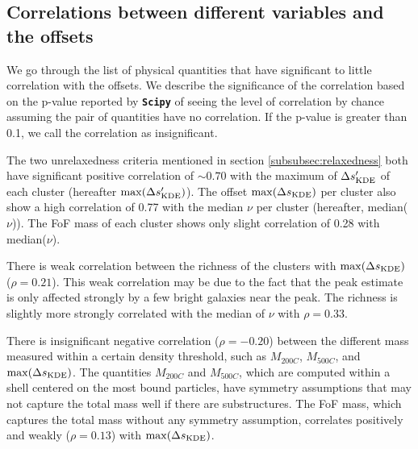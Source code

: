 \subsection{Correlations between different variables and the offsets}

We go through the list of physical quantities that have significant to little
correlation with the offsets. We describe the significance of the correlation 
based on the p-value reported by {\bf \texttt{Scipy}} of seeing the level of 
correlation by chance assuming the pair of 
quantities have no correlation. If the p-value is greater than 0.1, we call the
correlation as insignificant.

The two unrelaxedness criteria mentioned in section \ref{subsubsec:relaxedness}
both have significant positive correlation of $\sim 0.70$
with the maximum of $\Delta s_{\rm KDE}'$ of each cluster
(hereafter $\max(\Delta s_{\rm KDE}')$).
The offset $\max(\Delta s_{\rm KDE})$ per cluster also show a high
correlation of 0.77 with the median $\nu$ per cluster (hereafter,
median($\nu$)). The FoF mass of each cluster shows only slight correlation of 0.28 with 
 median($\nu$).

There is weak correlation between the richness of the
clusters with $\max(\Delta s_{\rm KDE})$ ($\rho = 0.21$). This weak correlation 
may be due to 
the fact that the peak estimate is only affected strongly by a few bright galaxies near 
the peak. The richness is slightly more strongly correlated with the median of $\nu$ 
with $\rho = 0.33$. 

There is insignificant negative correlation ($\rho = -0.20$) between the different mass 
measured within a certain density threshold, such as $M_{200C}$, $M_{500C}$, 
and $\max(\Delta s_{\rm KDE})$. The quantities $M_{200C}$ and $M_{500C}$, which
are computed within a shell centered on the most bound particles, have
symmetry assumptions that may not capture the total mass well if there are substructures. 
The FoF mass, which
captures the total mass without any symmetry assumption, correlates positively
and weakly 
($\rho = 0.13$) with $\max(\Delta s_{\rm KDE})$. 



% 
 
